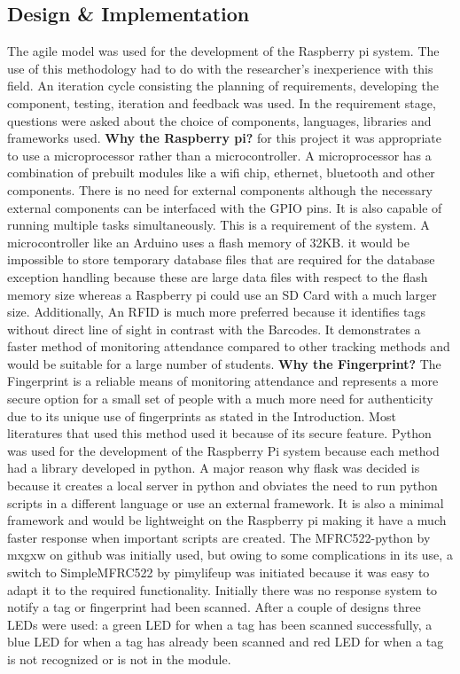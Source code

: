 \subsection*{Design \& Implementation}
The agile model was used for the development of the Raspberry pi system. The use of this methodology had to do with the researcher's inexperience with this field. An iteration cycle consisting the planning of requirements, developing the component, testing, iteration and feedback was used. In the requirement stage, questions were asked about the choice of components, languages, libraries and frameworks used. \textbf{Why the Raspberry pi?} for this project it was appropriate to use a microprocessor rather than a microcontroller. A microprocessor has a combination of prebuilt modules like a wifi chip, ethernet, bluetooth and other components. There is no need for external components although the necessary external components can be interfaced with the \gls{GPIO} pins. It is also capable of running multiple tasks simultaneously. This is a requirement of the system. A microcontroller like an Arduino uses a flash memory of 32KB. it would be impossible to store temporary database files that are required for the database exception handling because these are large data files with respect to the flash memory size whereas a Raspberry pi could use an SD Card with a much larger size. Additionally,
An \gls{RFID} is much more preferred because it identifies tags without direct line of sight in contrast with the Barcodes. It demonstrates a faster method of monitoring attendance compared to other tracking methods and would be suitable for a large number of students. \textbf{Why the Fingerprint?} The Fingerprint is a reliable means of monitoring attendance and represents a more secure option for a small set of people with a much more need for authenticity due to its unique use of fingerprints as stated in the Introduction. Most literatures that used this method used it because of its secure feature. Python was used for the development of the Raspberry Pi system because each method had a library developed in python.
A major reason why flask was decided is because it creates a local server in python and obviates the need to run python scripts in a different language or use an external framework. It is also a minimal framework and would be lightweight on the Raspberry pi making it have a much faster response when important scripts are created.
The MFRC522-python by mxgxw on github was initially used,\cite{mxgxwMFR34:online} but owing to some complications in its use, a switch to SimpleMFRC522 by pimylifeup was initiated because it was easy to adapt it to the required functionality.\cite{pimylife71:online}
Initially there was no response system to notify a tag or fingerprint had been scanned. After a couple of designs three LEDs were used: a green LED for when a tag has been scanned successfully, a blue LED for when a tag has already been scanned and red LED for when a tag is not recognized or is not in the module.
 
